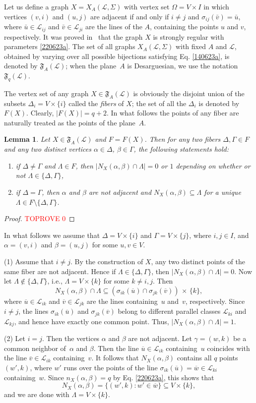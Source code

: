 \documentclass{amsart}
\newcommand{\cal}{\mathcal}
\newtheorem{lemma}[formula]{Lemma}
\def\nmrt{\begin{enumerate}}
\def\enmrt{\end{enumerate}}
\def\tm#1{\item[{\rm (#1)}]}
\def\lmml#1{\begin{lemma}\label{#1}}
\def\elmm{\end{lemma}}
\def\prf{\begin{proof}\textcolor{red}{TOPROVE 0}\end{proof}}
\def\cL{{\cal L}}
\def\fF{{\mathfrak F}}
\def\ov{\overline}
\begin{document}
Let us define a graph $X=X_A(\cL,\Sigma)$ with vertex set $\Omega=V\times I$ in which vertices $(v,i)$ and $(u,j)$ are adjacent if and only if $i\ne j$  and $\sigma_{ij}(\bar v)=\bar u$, where $\bar u\in\cL_{ij}$ and $\bar v\in\cL_{ji}$ are the lines of the $A$, containing the points $u$ and $v$, respectively. It was proved in~ \cite{FonDF2002} that the graph $X$ is  strongly regular with parameters \eqref{220623a}. The set of all graphs $X_A(\cL,\Sigma)$ with fixed $A$ and $\cL$, obtained by varying over all possible 
bijections satisfying Eq. \eqref{140623a}, is denoted by $\fF_A(\cL)$; 
when the plane~$A$ is Desarguesian, we use the notation $\fF_q(\cL)$.

The vertex set of any graph $X\in \fF_A(\cL)$ is obviously the disjoint union of the subsets $\Delta_i=V\times\{i\}$ called the \emph{fibers} of $X$; the set of all the $\Delta_i$ is denoted by~$F(X)$. Clearly, $|F(X)|=q+2$. In what follows the points of any fiber are naturally treated as the points  of the plane~$A$.

\lmml{060623a1}
Let $X\in \fF_A(\cL)$ and $F=F(X)$. Then for any two fibers $\Delta,\Gamma\in F$ and any two distinct vertices $\alpha\in\Delta$, $\beta\in\Gamma$, the following statements hold:
\nmrt
\tm{1} if $\Delta\ne\Gamma$ and $\Lambda\in F$, then $|N_X(\alpha,\beta)\cap \Lambda|=0$  or $1$ depending on whether or not $\Lambda\in\{\Delta,\Gamma\}$,
\tm{2} if $\Delta=\Gamma$, then $\alpha$ and $\beta$ are not adjacent and $N_X(\alpha,\beta)\subseteq \Lambda$ for a unique  $\Lambda\in F\setminus\{\Delta,\Gamma\}$.
\enmrt
\elmm
\prf
In what follows we assume that $\Delta=V\times\{i\}$ and  $\Gamma=V\times\{j\}$, where $i,j\in I$, and $\alpha=(v,i)$ and $\beta=(u,j)$ for some $u,v\in V$.

(1) Assume that $i\ne j$. By the construction of $X$, any two distinct points of the same fiber are not adjacent. Hence if $\Lambda\in\{\Delta,\Gamma\}$, then $|N_X(\alpha,\beta)\cap \Lambda|=0$. Now let $\Lambda\notin\{\Delta,\Gamma\}$, i.e., $\Lambda=V\times\{k\}$ for some $k\ne i,j$.  Then 
$$
N_X(\alpha,\beta)\cap \Lambda\subseteq 
\left(\sigma_{ik}(\ov u)\cap \sigma_{jk}(\ov v)\right)\, \times\,\{k\},
$$
where  $\ov u\in \cL_{ik}$ and $\ov v\in \cL_{jk}$  are the lines containing~$u$ and~$v$, respectively. Since $i\ne j$, the lines  $\sigma_{ik}(\ov u)$ and $\sigma_{jk}(\ov v)$ belong to different parallel classes $\cL_{ki}$ and $\cL_{kj}$, and hence have 
exactly one common point. Thus,
$|N_X(\alpha,\beta)\cap \Lambda|=1$.

(2) Let $i=j$. Then the vertices  $\alpha$ and $\beta$ are not adjacent. Let $\gamma=(w,k)$ be a common neighbor of~$\alpha$ and $\beta$. Then the line $\ov u\in\cL_{ik}$ containing~$u$ coincides with the line $\ov v\in \cL_{ik}$ containing~$v$. It follows that $N_X(\alpha,\beta)$ contains all $q$ points $(w',k)$, where $w'$ runs over the points of 
the line $\sigma_{ik}(\ov u)=\ov w\in\cL_{ki}$ containing~$w$. 
Since $n_X(\alpha,\beta)=q$ by Eq. \eqref{220623a}, 
this shows that 
$$
N_X(\alpha,\beta)=\{(w',k)\colon w'\in\ov w\}\subseteq V\times\{k\},
$$
and we are done with $\Lambda=V\times\{k\}$.
\eprf
\end{document}
